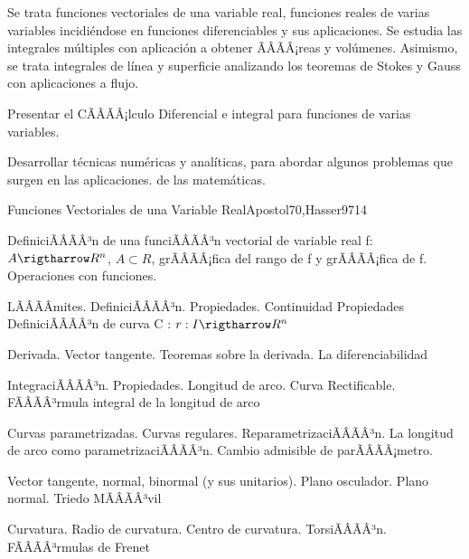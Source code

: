 \begin{sumilla}


\begin{fundamentacion}
Se trata funciones vectoriales de una variable real, funciones reales de varias variables incidi\'endose en funciones diferenciables y sus aplicaciones. Se estudia las integrales m\'ultiples con aplicaci\'on a obtener ÃÂÃÂ¡reas y vol\'umenes.
Asimismo, se trata integrales de l\'inea y superficie analizando los teoremas de Stokes y Gauss con aplicaciones a flujo.
\end{fundamentacion}

\begin{objetivosdelcurso}
\item  Presentar el CÃÂÃÂ¡lculo Diferencial e integral para funciones de varias variables.
\item  Desarrollar t\'ecnicas num\'ericas y anal\'iticas, para abordar algunos problemas que surgen en las aplicaciones. de las matem\'aticas.
\end{objetivosdelcurso}

\begin{outcomes}
\end{outcomes}

\begin{unit}{Funciones Vectoriales de una Variable Real}{Apostol70,Hasser97}{14}
   \begin{topicos}
	\item  DefiniciÃÂÃÂ³n de una funciÃÂÃÂ³n vectorial de variable real f: $A \rigtharrow R^n$, $A \subset R$, grÃÂÃÂ¡fica del rango de f y grÃÂÃÂ¡fica de f. Operaciones con funciones.
	\item LÃÂÃÂ­mites. DefiniciÃÂÃÂ³n. Propiedades. Continuidad  Propiedades DefiniciÃÂÃÂ³n de curva C : $r : I \rigtharrow R^n$
	\item  Derivada. Vector tangente. Teoremas sobre la derivada. La diferenciabilidad
	\item  IntegraciÃÂÃÂ³n. Propiedades. Longitud de arco. Curva Rectificable. FÃÂÃÂ³rmula integral de la longitud de arco
	\item  Curvas parametrizadas. Curvas regulares. ReparametrizaciÃÂÃÂ³n. La longitud de arco como parametrizaciÃÂÃÂ³n. Cambio admisible de parÃÂÃÂ¡metro.
	\item  Vector tangente, normal, binormal (y sus unitarios). Plano osculador. Plano normal. Triedo MÃÂÃÂ³vil
	\item Curvatura. Radio de curvatura.  Centro de curvatura. TorsiÃÂÃÂ³n. FÃÂÃÂ³rmulas de Frenet
   \end{topicos}


\end{unit}
\end{sumilla}

